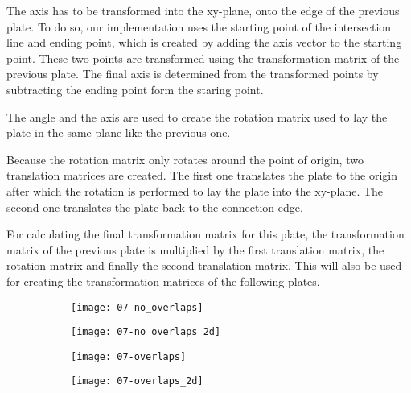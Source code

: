 \documentclass[../ClassicThesis.tex]{subfiles}
\begin{document}
The axis has to be transformed into the xy-plane, onto the edge of the previous plate. To do so, our implementation uses the starting point of the intersection line and ending point, which is created by adding the axis vector to the starting point. These two points are transformed using the transformation matrix of the previous plate. The final axis is determined from the transformed points by subtracting the ending point form the staring point.

The angle and the axis are used to create the rotation matrix used to lay the plate in the same plane like the previous one.

Because the rotation matrix only rotates around the point of origin, two translation matrices are created. The first one translates the plate to the origin after which the rotation is performed to lay the plate into the xy-plane. The second one translates the plate back to the connection edge.

For calculating the final transformation matrix for this plate, the transformation matrix of the previous plate is multiplied by the first translation matrix, the rotation matrix and finally the second translation matrix. This will also be used for creating the transformation matrices of the following plates.

\begin{figure}[h]
  \centering
  \begin{subfigure}[b]{0.49\textwidth}
    \centering
    \texttt{[image: 07-no\_overlaps]}
    \caption{}
    \label{fig:bend-matrix:1}
  \end{subfigure}
  \begin{subfigure}[b]{0.49\textwidth}
    \centering
    \texttt{[image: 07-no\_overlaps\_2d]}
    \caption{}
    \label{fig:bend-matrix:2}
  \end{subfigure}
  \begin{subfigure}[b]{0.49\textwidth}
    \centering
    \texttt{[image: 07-overlaps]}
    \caption{}
    \label{fig:bend-matrix:3}
  \end{subfigure}
  \begin{subfigure}[b]{0.49\textwidth}
    \centering
    \texttt{[image: 07-overlaps\_2d]}
    \caption{}
    \label{fig:bend-matrix:4}
  \end{subfigure}
  \caption{}
  \label{fig:bend-matrix}
\end{figure}
\end{document}
